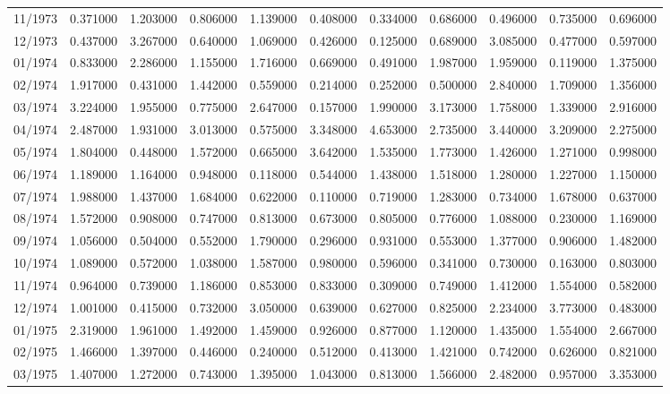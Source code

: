 \begin{tabular}{lrrrrrrrrrr}
11/1973 & 0.371000 & 1.203000 & 0.806000 & 1.139000 & 0.408000 & 0.334000 & 0.686000 & 0.496000 & 0.735000 & 0.696000 \\
12/1973 & 0.437000 & 3.267000 & 0.640000 & 1.069000 & 0.426000 & 0.125000 & 0.689000 & 3.085000 & 0.477000 & 0.597000 \\
01/1974 & 0.833000 & 2.286000 & 1.155000 & 1.716000 & 0.669000 & 0.491000 & 1.987000 & 1.959000 & 0.119000 & 1.375000 \\
02/1974 & 1.917000 & 0.431000 & 1.442000 & 0.559000 & 0.214000 & 0.252000 & 0.500000 & 2.840000 & 1.709000 & 1.356000 \\
03/1974 & 3.224000 & 1.955000 & 0.775000 & 2.647000 & 0.157000 & 1.990000 & 3.173000 & 1.758000 & 1.339000 & 2.916000 \\
04/1974 & 2.487000 & 1.931000 & 3.013000 & 0.575000 & 3.348000 & 4.653000 & 2.735000 & 3.440000 & 3.209000 & 2.275000 \\
05/1974 & 1.804000 & 0.448000 & 1.572000 & 0.665000 & 3.642000 & 1.535000 & 1.773000 & 1.426000 & 1.271000 & 0.998000 \\
06/1974 & 1.189000 & 1.164000 & 0.948000 & 0.118000 & 0.544000 & 1.438000 & 1.518000 & 1.280000 & 1.227000 & 1.150000 \\
07/1974 & 1.988000 & 1.437000 & 1.684000 & 0.622000 & 0.110000 & 0.719000 & 1.283000 & 0.734000 & 1.678000 & 0.637000 \\
08/1974 & 1.572000 & 0.908000 & 0.747000 & 0.813000 & 0.673000 & 0.805000 & 0.776000 & 1.088000 & 0.230000 & 1.169000 \\
09/1974 & 1.056000 & 0.504000 & 0.552000 & 1.790000 & 0.296000 & 0.931000 & 0.553000 & 1.377000 & 0.906000 & 1.482000 \\
10/1974 & 1.089000 & 0.572000 & 1.038000 & 1.587000 & 0.980000 & 0.596000 & 0.341000 & 0.730000 & 0.163000 & 0.803000 \\
11/1974 & 0.964000 & 0.739000 & 1.186000 & 0.853000 & 0.833000 & 0.309000 & 0.749000 & 1.412000 & 1.554000 & 0.582000 \\
12/1974 & 1.001000 & 0.415000 & 0.732000 & 3.050000 & 0.639000 & 0.627000 & 0.825000 & 2.234000 & 3.773000 & 0.483000 \\
01/1975 & 2.319000 & 1.961000 & 1.492000 & 1.459000 & 0.926000 & 0.877000 & 1.120000 & 1.435000 & 1.554000 & 2.667000 \\
02/1975 & 1.466000 & 1.397000 & 0.446000 & 0.240000 & 0.512000 & 0.413000 & 1.421000 & 0.742000 & 0.626000 & 0.821000 \\
03/1975 & 1.407000 & 1.272000 & 0.743000 & 1.395000 & 1.043000 & 0.813000 & 1.566000 & 2.482000 & 0.957000 & 3.353000 \\

\end{tabular}
